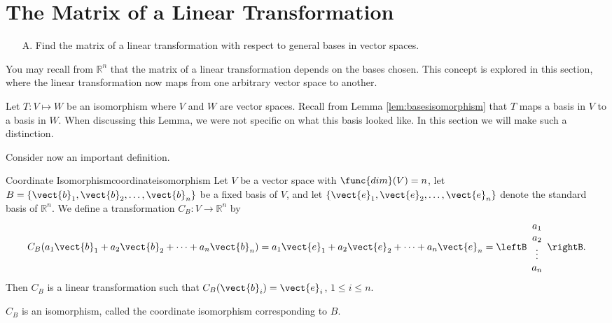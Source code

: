 \section{The Matrix of a Linear Transformation}

\begin{outcome}

\begin{enumerate}

\item[A.] Find the matrix of a linear transformation with respect to general bases in vector spaces. 

\end{enumerate}
\end{outcome}

You may recall from $\mathbb{R}^n$ that the matrix of a linear transformation depends on the bases chosen. This concept is explored in this section, where the linear transformation now maps from one arbitrary vector space to another. 

Let $T: V \mapsto W$ be an isomorphism where $V$ and $W$ are vector spaces. Recall from Lemma \ref{lem:basesisomorphism} that $T$ maps a basis in $V$ to a basis in $W$. When discussing this Lemma, we were not specific on what this basis looked like. In this section we will make such a distinction. 

Consider now an important definition.

\begin{definition}{Coordinate Isomorphism}{coordinateisomorphism}
Let $V$ be a vector space with $\func{dim}(V)=n$, let $B=\{ \vect{b}_1, \vect{b}_2, \ldots, \vect{b}_n \}$ be a fixed basis of $V$,
and let $\{ \vect{e}_1, \vect{e}_2, \ldots, \vect{e}_n \}$
denote the standard basis of $\mathbb{R}^n$.
We define a transformation $C_B:V\to\mathbb{R}^n$ by
\[
C_B(a_1\vect{b}_1 + a_2\vect{b}_2 + \cdots + a_n\vect{b}_n)
=
a_1\vect{e}_1 + a_2\vect{e}_2 + \cdots + a_n\vect{e}_n
=
\leftB\begin{array}{c} a_1 \\ a_2 \\ \vdots \\ a_n
\end{array}\rightB.\]
Then $C_B$ is a linear transformation
such that
$C_B(\vect{b}_i)=\vect{e}_i$, $1\leq i\leq n$.

$C_B$ is an isomorphism, called
the coordinate isomorphism corresponding to $B$.
\end{definition}

